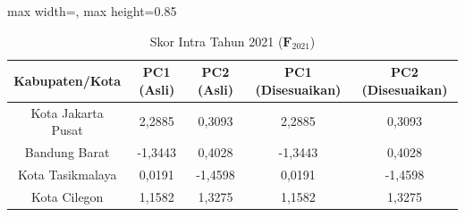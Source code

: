 \begin{table}[H]
\centering
\caption{Skor Intra Tahun 2021 ($\mathbf{F}_{2021}$)} \label{tab:sample2skor_intra_2021}
\begin{adjustbox}{max width=\textwidth, max height=0.85\textheight}
\begin{tabular}{|c|c|c|c|c|}
\hline
\textbf{Kabupaten/Kota} & \textbf{PC1 (Asli)} & \textbf{PC2 (Asli)} & \textbf{PC1 (Disesuaikan)} & \textbf{PC2 (Disesuaikan)} \\
\hline
Kota Jakarta Pusat & 2,2885 & 0,3093 & 2,2885 & 0,3093 \\
Bandung Barat & -1,3443 & 0,4028 & -1,3443 & 0,4028 \\
Kota Tasikmalaya & 0,0191 & -1,4598 & 0,0191 & -1,4598 \\
Kota Cilegon & 1,1582 & 1,3275 & 1,1582 & 1,3275 \\
\hline
\end{tabular}
\end{adjustbox}
\end{table}